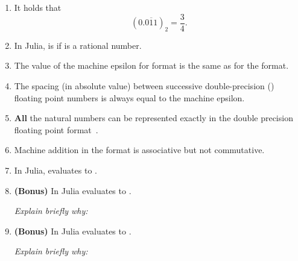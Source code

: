 \documentclass[a4paper]{article}
\begin{document}
\begin{enumerate}
    \item
        It holds that
        \[
            (0.\overline{011})_2 = \frac{3}{4}.
        \]

    \item
        In Julia,  is  if  is a rational number.

    \item
        The value of the machine epsilon for  format is the same as for the  format.

    \item
        The spacing (in absolute value) between successive double-precision () floating point numbers is always equal to the machine epsilon.

    \item
        \textbf{All} the natural numbers can be represented exactly in the double precision floating point format~.

    \item
        Machine addition in the  format is associative but not commutative.

    \item
        In Julia,  evaluates to .

    \item
        \textbf{(Bonus)}
        In Julia  evaluates to .

        \emph{Explain briefly why:}
        \vspace{2.5cm}

    \item
        \textbf{(Bonus)}
         In Julia  evaluates to .

        \emph{Explain briefly why:}
         \vspace{2.5cm}
\end{enumerate}

\ifdefined\showsolutions
\newpage
{}
\end{document}
